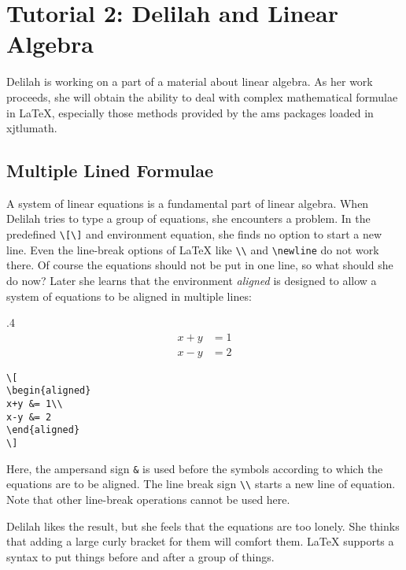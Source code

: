 \section{Tutorial 2: Delilah and Linear Algebra}
Delilah is working on a part of a material about linear algebra. As her work proceeds, she will obtain the ability to deal with complex mathematical formulae in \LaTeX{}, especially those methods provided by the ams packages loaded in xjtlumath.

\subsection{Multiple Lined Formulae}
A system of linear equations is a fundamental part of linear algebra. When Delilah tries to type a group of equations, she encounters a problem. In the predefined \verb=\[\]= and environment equation, she finds no option to start a new line. Even the line-break options of \LaTeX{} like \verb=\\= and \verb=\newline= do not work there. Of course the equations should not be put in one line, so what should she do now? Later she learns that the environment \emph{aligned} is designed to allow a system of equations to be aligned in multiple lines:

\begin{miniexammar}{.4\textandmarginlen}{
\[
\begin{aligned}
x+y &= 1\\
x-y &= 2
\end{aligned}
\]
}
\begin{lstlisting}
\[
\begin{aligned}
x+y &= 1\\
x-y &= 2
\end{aligned}
\]
\end{lstlisting}
\end{miniexammar}
Here, the ampersand sign \verb=&= is used before the symbols according to which the equations are to be aligned. The line break sign \verb=\\= starts a new line of equation. Note that other line-break operations cannot be used here.

Delilah likes the result, but she feels that the equations are too lonely. She thinks that adding a large curly bracket for them will comfort them. \LaTeX{} supports a syntax to put things before and after a group of things.

